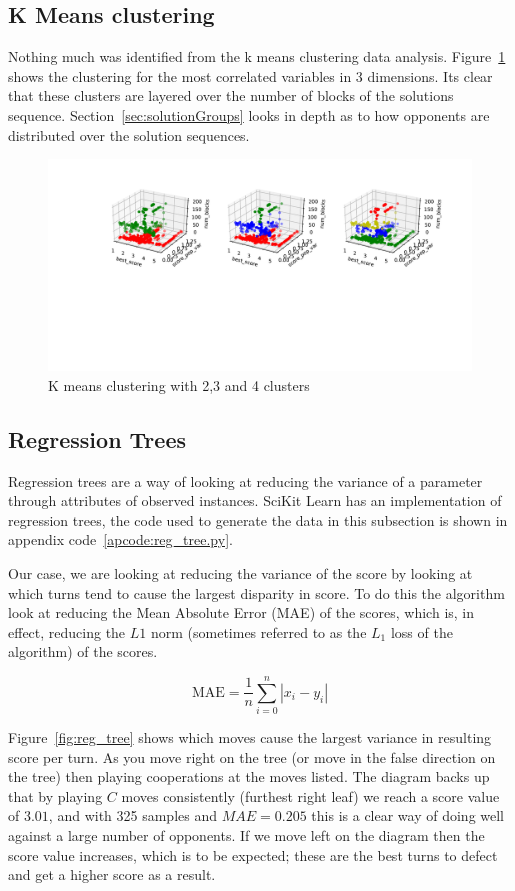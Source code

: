 \subsection{K Means clustering~\cite{bora2014effect}}\label{ssec:k_means}
Nothing much was identified from the k means clustering data analysis.
Figure~\ref{fig:k_means} shows the clustering for the most correlated variables in 3 dimensions.
Its clear that these clusters are layered over the number of blocks of the solutions sequence.
Section~\ref{sec:solutionGroups} looks in depth as to how opponents are distributed over the solution sequences.  

\begin{figure}[ht]
    \includegraphics[width=1.0\textwidth, center]{./img/descriptive/k_means.pdf}
    \caption{K means clustering with 2,3 and 4 clusters}\label{fig:k_means}
\end{figure}

\subsection{Regression Trees}
Regression trees are a way of looking at reducing the variance of a parameter through attributes of observed instances. 
SciKit Learn has an implementation of regression trees, the code used to generate the data in this subsection is shown in appendix code~\ref{apcode:reg_tree.py}.

Our case, we are looking at reducing the variance of the score by looking at which turns tend to cause the largest disparity in score.
To do this the algorithm look at reducing the Mean Absolute Error (MAE) of the scores, which is, in effect, reducing the $L1$ norm (sometimes referred to as the $L_1$ loss of the algorithm) of the scores.

$$\text{MAE} = \frac{1}{n}\sum_{i=0}^n |x_i-y_i|$$

Figure~\ref{fig:reg_tree} shows which moves cause the largest variance in resulting score per turn.
As you move right on the tree (or move in the false direction on the tree) then playing cooperations at the moves listed. 
The diagram backs up that by playing $C$ moves consistently (furthest right leaf) we reach a score value of $3.01$, and with 325 samples and $MAE=0.205$ this is a clear way of doing well against a large number of opponents.
If we move left on the diagram then the score value increases, which is to be expected; these are the best turns to defect and get a higher score as a result.

